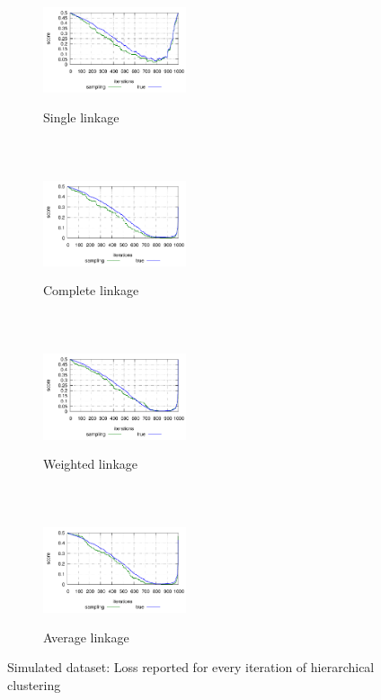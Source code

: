 \begin{figure}[t]
    \centering
    \begin{subfigure}[t]{0.22\textwidth}
        \centering
        \includegraphics[height=3.2cm, width=4.2cm,valign=t]{figures/plot_simulated_s.pdf}
        \caption{Single linkage}
    \end{subfigure}%
    ~ 
    \begin{subfigure}[t]{0.22\textwidth}
        \centering
        \includegraphics[height=3.2cm, width=4.2cm,valign=t]{figures/plot_simulated_c.pdf}
        \caption{Complete linkage}
    \end{subfigure}
	~
	\begin{subfigure}[t]{0.22\textwidth}
        \centering
        \includegraphics[height=3.2cm, width=4.2cm,valign=t]{figures/plot_simulated_w.pdf}
        \caption{Weighted linkage}
    \end{subfigure}
    ~
	\begin{subfigure}[t]{0.22\textwidth}
        \centering
        \includegraphics[height=3.2cm, width=4.2cm,valign=t]{figures/plot_simulated_a.pdf}
        \caption{Average linkage}
    \end{subfigure}
    
    \caption{Simulated dataset: Loss reported for every iteration of hierarchical clustering}
    \label{fig:simulated}
\end{figure}

